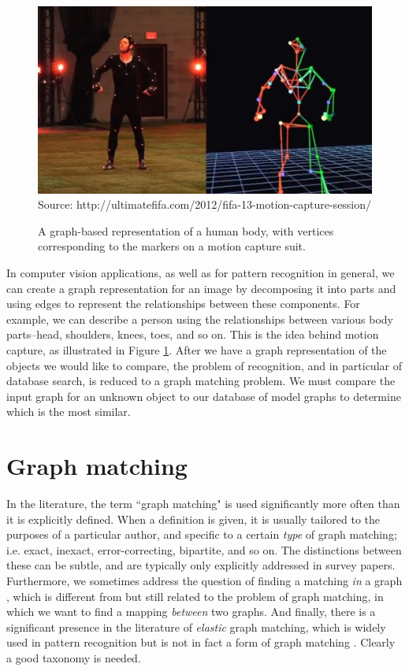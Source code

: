 \documentclass[12pt]{thesis}
\theoremstyle{plain}
\theoremstyle{definition}
\theoremstyle{remark}
\begin{document}
\begin{figure}[h!]
\centering
\includegraphics[width=\textwidth]{motion_capture_demo.png}
\scriptsize Source: http://ultimatefifa.com/2012/fifa-13-motion-capture-session/
\caption{A graph-based representation of a human body, with vertices corresponding to the markers on a motion capture suit.}
\label{motion_capture_demo}
\end{figure}

In computer vision applications, as well as for pattern recognition in general, we can create a graph representation for an image by decomposing it into parts and using edges to represent the relationships between these components. For example, we can describe a person using the relationships between various body parts--head, shoulders, knees, toes, and so on. This is the idea behind motion capture, as illustrated in Figure \ref{motion_capture_demo}. After we have a graph representation of the objects we would like to compare, the problem of recognition, and in particular of database search, is reduced to a graph matching problem. We must compare the input graph for an unknown object to our database of model graphs to determine which is the most similar.








\section{Graph matching}\label{section:defining_graph_matching}

In the literature, the term ``graph matching" is used significantly more often than it is explicitly defined. When a definition is given, it is usually tailored to the purposes of a particular author, and specific to a certain \textit{type} of graph matching; i.e. exact, inexact, error-correcting, bipartite, and so on. The distinctions between these can be subtle, and are typically only explicitly addressed in survey papers. Furthermore, we sometimes address the question of finding a matching \textit{in} a graph \cite{wikiMatchingInAGraph}, which is different from but still related to the problem of graph matching, in which we want to find a mapping \textit{between} two graphs. And finally, there is a significant presence in the literature of \textit{elastic} graph matching, which is widely used in pattern recognition but is not in fact a form of graph matching \cite{Conte_2003}. Clearly a good taxonomy is needed.
\end{document}
